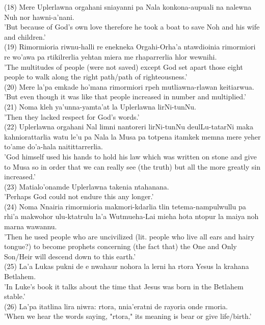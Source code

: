 \documentclass[10pt]{article}
\begin{document}
(18) Mere Uplerlawna orgahani sniayanni pa Nala konkona-aupuali na nalewna Nuh nor hawni-a'nani.\\
'But because of God's own love therefore he took a boat to save Noh and his wife and children.'\\
(19) Rimormioria riwnu-halli re enekneka Orgahi-Orha'a ntawdioinia rimormiori re wo'awa pa rtikilrerlia yehtan miera me rhaparrerlia hlor wewnihi.\\
'The multitudes of people (were not saved) except God set apart those eight people to walk along the right path/path of righteousness.'\\
(20) Mere la'pa emkade ho'mana rimormiori rpeh mutliawna-rlawan keitiarwua.\\
'But even though it was like that people increased in number and multiplied.'\\
(21) Noma kleh ya'unna-yamta'at la Uplerlawna lirNi-tunNu.\\
'Then they lacked respect for God's words.'\\
(22) Uplerlawna orgahani Nal limni nantoreri lirNi-tunNu deulLu-tatarNi maka kahniorattarlia watu le'u pa Nala la Musa pa totpena itamkek memna mere yeher to'ame do'a-hala naitittarrerlia.\\
'God himself used his hands to hold his law which was written on stone and give to Musa so in order that we can really see (the truth) but all the more greatly sin increased.'\\
(23) Matialo'onamde Uplerlawna takenia ntahanana.\\
'Perhaps God could not endure this any longer.'\\
(24) Noma Nnairia rimormioria makmori-kdarlia tlin tetema-nampulwullu pa rhi'a makwohor ulu-ktatrulu la'a Wutmueha-Lai mieha hota ntopur la maiya noh marna wawannu.\\
'Then he used people who are uncivilized (lit. people who live all ears and hairy tongue?) to become prophets concerning (the fact that) the One and Only Son/Heir will descend down to this earth.'\\
(25) La'a Lukas pukni de e nwahaur nohora la lerni ha rtora Yesus la krahana Betlahem.\\
'In Luke's book it talks about the time that Jesus was born in the Betlahem stable.'\\
(26) La'pa itatlina lira niwra: rtora, nnia'eratni de rayoria onde rmoria.\\
'When we hear the words saying, "rtora," its meaning is bear or give life/birth.'\\
\end{document}
